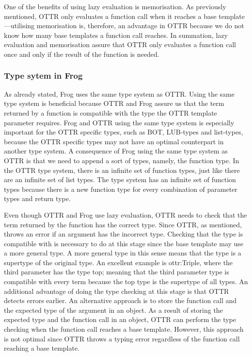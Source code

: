 \para
One of the benefits of using lazy evaluation is memorisation. As previously mentioned, OTTR only evaluates a function call when it reaches a base template—utilising memorisation is, therefore, an advantage in OTTR because we do not know how many base templates a function call reaches. In summation, lazy evaluation and memorisation assure that OTTR only evaluates a function call once and only if the result of the function is needed.

\subsubsection{Type sytem in Frog}
\label{types in frog}
As already stated, Frog uses the same type system as OTTR. Using the same type system is beneficial because OTTR and Frog assure us that the term returned by a function is compatible with the type the OTTR template parameter requires. Frog and OTTR using the same type system is especially important for the OTTR specific types, such as BOT, LUB-types and list-types, because the OTTR specific types may not have an optimal counterpart in another type system. A consequence of Frog using the same type system as OTTR is that we need to append a sort of types, namely, the function type.  In the OTTR type system, there is an infinite set of function types, just like there are an infinite set of list types. The type system has an infinite set of function types because there is a new function type for every combination of parameter types and return type. 

\para
Even though OTTR and Frog use lazy evaluation, OTTR needs to check that the term returned by the function has the correct type. Since OTTR, as mentioned, throws an error if an argument has the incorrect type. Checking that the type is compatible with is necessary to do at this stage since the base template may use a more general type. A more general type in this sense means that the type is a supertype of the original type. An excellent example is ottr:Triple, where the third parameter has the type top; meaning that the third parameter type is compatible with every term because the top type is the supertype of all types. An additional advantage of doing the type checking at this stage is that OTTR detects errors earlier. An alternative approach is to store the function call and the expected type of the argument in an object. As a result of storing the expected type and the function call in an object, OTTR can perform the type checking when the function call reaches a base template. However, this approach is not optimal since OTTR throws a typing error regardless of the function call reaching a base template. 

